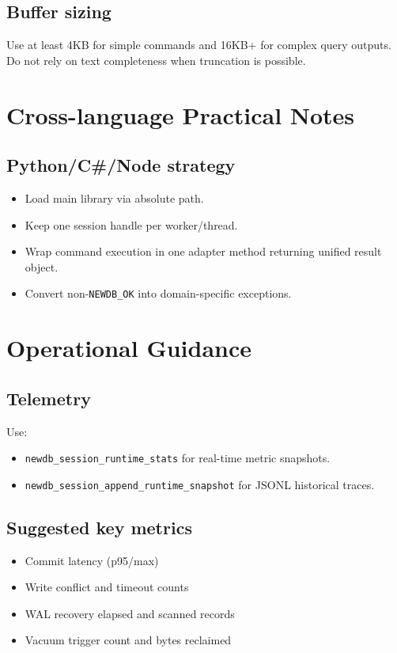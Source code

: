 \documentclass[11pt,a4paper]{article}
\begin{document}
\subsection{Buffer sizing}
Use at least 4KB for simple commands and 16KB+ for complex query outputs.
Do not rely on text completeness when truncation is possible.

\section{Cross-language Practical Notes}
\subsection{Python/C\#/Node strategy}
\begin{itemize}
  \item Load main library via absolute path.
  \item Keep one session handle per worker/thread.
  \item Wrap command execution in one adapter method returning unified result object.
  \item Convert non-\texttt{NEWDB\_OK} into domain-specific exceptions.
\end{itemize}

\section{Operational Guidance}
\subsection{Telemetry}
Use:
\begin{itemize}
  \item \texttt{newdb\_session\_runtime\_stats} for real-time metric snapshots.
  \item \texttt{newdb\_session\_append\_runtime\_snapshot} for JSONL historical traces.
\end{itemize}

\subsection{Suggested key metrics}
\begin{itemize}
  \item Commit latency (p95/max)
  \item Write conflict and timeout counts
  \item WAL recovery elapsed and scanned records
  \item Vacuum trigger count and bytes reclaimed
\end{itemize}
\end{document}
